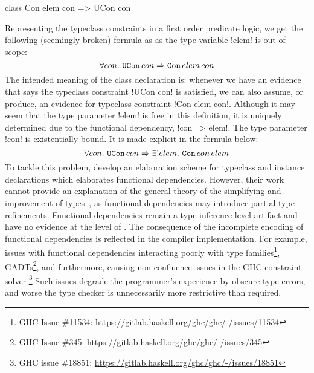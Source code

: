 \documentclass[screen,nonacm,manuscript,review]{acmart} %
\begin{document}
\begin{CenteredBox}
\begin{code}
class Con elem con => UCon con
\end{code}
\end{CenteredBox}

Representing the typeclass constraints in a first order predicate logic, we get the following
(seemingly broken) formula as as the type variable !elem! is out of scope:
\[
\forall con.~\texttt{UCon}\, con \Rightarrow \texttt{Con}\, elem\, con
\]
The intended meaning of the class declaration is:
whenever we have an evidence that says the typeclass constraint
!UCon con! is satisfied, we can also assume, or produce, an
evidence for typeclass constraint !Con elem con!.
Although it may seem that the type parameter
!elem! is free in this definition, it is uniquely
determined due to the functional dependency, !con ~> elem!.
The type parameter !con! is existentially
bound. It is made explicit in the formula below:
\[
\forall con.~\texttt{UCon}\, con \Rightarrow \exists! elem.~\texttt{Con}\, con\, elem
\]
To tackle this problem, \citet{karachalias_elaboration_2017} develop an
elaboration scheme for typeclass and instance declarations which
elaborates functional dependencies. However,
their work cannot provide an explanation of the general theory of
the simplifying and improvement of types~\cite{jones_simplifying_1995},
as functional dependencies may introduce partial type
refinements. Functional dependencies remain a type inference level
artifact and have no evidence at the level of \SFC.
The consequence of the incomplete encoding of functional
dependencies is reflected in the compiler implementation.
For example, issues with functional dependencies interacting
poorly with type families\footnote{GHC Issue \#11534:
  \url{https://gitlab.haskell.org/ghc/ghc/-/issues/11534}},
GADTs\footnote{GHC Issue \#345:
  \url{https://gitlab.haskell.org/ghc/ghc/-/issues/345}},
and furthermore, causing non-confluence issues in the GHC constraint
solver \footnote{GHC issue \#18851:
  \url{https://gitlab.haskell.org/ghc/ghc/-/issues/18851}}
Such issues degrade the programmer's experience by
obscure type errors, and worse the type checker
is unnecessarily more restrictive than required.
\end{document}
